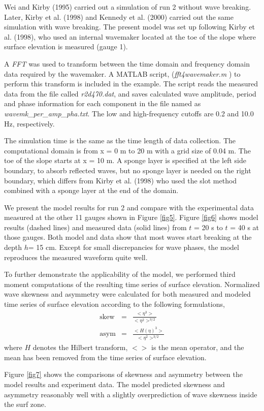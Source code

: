 \documentclass[11pt]{article}
\newcommand{\ba}{\begin{eqnarray}}
\newcommand{\ea}{\end{eqnarray}}
\begin{document}
Wei and Kirby (1995) carried out a simulation of run 2 without wave breaking. Later, Kirby et al. (1998) and Kennedy et al. (2000) carried out the same simulation  with  wave breaking.  The present model was set up following Kirby et al. (1998), who used an internal wavemaker located at the toe of the slope where surface elevation is measured (gauge 1). 

A {\em FFT} was used to  transform between the time domain and frequency domain data required by the wavemaker. A MATLAB script, ({\em fft4wavemaker.m }) to perform this transform is included in the example.  The script reads the measured data from the file called {\em r2d470.dat}, and saves calculated wave amplitude, period and phase information for each component in the file named as {\em wavemk\_per\_amp\_pha.txt}. 
The low and high-frequency cutoffs are 0.2 and 10.0 Hz, respectively. 

The simulation time is the same as the time length of data collection. The computational domain is from x = 0 m to 20 m with a grid size of  0.04 m. The toe of the slope starts at x = 10 m. A sponge layer is specified  at the left side boundary,  to absorb reflected waves, but no sponge layer is needed on the right boundary, which differs  from Kirby et al. (1998) who used the slot method combined with a sponge layer at the end of the domain.      

We present the model results for run 2 and compare with the experimental data measured at the other 11 gauges  shown in Figure \ref{fig5}.  Figure \ref{fig6} shows model results (dashed lines) and measured data (solid lines) from $ t$ = 20 s to $t $ = 40 s at those gauges.   Both model and data show that most waves start breaking at the depth $h $= 15 cm.  Except for small discrepancies for wave phases, the model reproduces the measured waveform quite well. 

To further demonstrate the applicability of the model, we performed third moment computations of  the resulting time series of surface elevation. Normalized wave skewness and asymmetry were calculated for both measured and modeled time series of surface elevation according to the following formulations,
\ba
\mbox{skew} &= &  \frac{ < \eta^3>}{<\eta^2>^{3/2}} \nonumber \\
\mbox{asym} &=&  \frac{<H(\eta)^3>}{<\eta^2>^{3/2}}
\ea
where $H$ denotes the Hilbert transform, $< >$ is the mean operator, and the mean has been removed from the time series of surface elevation. 

Figure \ref{fig7} shows the comparisons of skewness and asymmetry between the model results and experiment data. The model predicted skewness and asymmetry reasonably well with a slightly overprediction of wave skewness inside the surf zone. 
\end{document}
